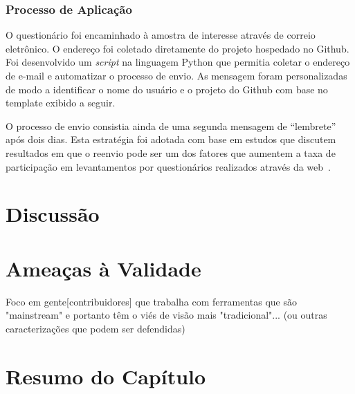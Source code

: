 
\subsubsection{Processo de Aplicação}
\label{ssub:processo_de_aplicação}

O questionário foi encaminhado à amostra de interesse através de correio
eletrônico. O endereço foi coletado diretamente do projeto hospedado no Github.
Foi desenvolvido um \textit{script} na linguagem Python que permitia coletar o
endereço de e-mail e automatizar o processo de envio. As mensagem foram
personalizadas de modo a identificar o nome do usuário e o projeto do Github
com base no template exibido a seguir.


O processo de envio consistia ainda de uma segunda mensagem de ``lembrete'' após
dois dias. Esta estratégia foi adotada com base em estudos que discutem
resultados em que o reenvio pode ser um dos fatores que aumentem a taxa de
participação em levantamentos por questionários realizados através da
web~\cite{fan2010factors}.

\section{Discussão}
\label{sec:sug_melhoria_discussao}

\section{Ameaças à Validade}
\label{sec:sug_melhoria_ameacas}

Foco em gente[contribuidores] que trabalha com ferramentas que são "mainstream"
e portanto têm o viés de visão mais "tradicional"...  (ou outras caracterizações
que podem ser defendidas)

\section{Resumo do Capítulo}
\label{sec:sug_melhoria_resumo}
